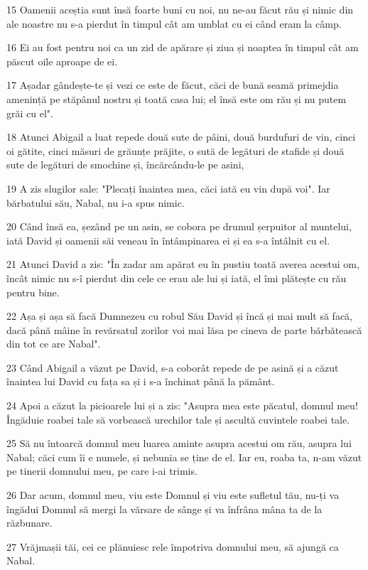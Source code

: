 \par 15 Oamenii aceștia sunt însă foarte buni cu noi, nu ne-au făcut rău și nimic din ale noastre nu s-a pierdut în timpul cât am umblat cu ei când eram la câmp.
\par 16 Ei au fost pentru noi ca un zid de apărare și ziua și noaptea în timpul cât am păscut oile aproape de ei.
\par 17 Așadar gândește-te și vezi ce este de făcut, căci de bună seamă primejdia amenință pe stăpânul nostru și toată casa lui; el însă este om rău și nu putem grăi cu el".
\par 18 Atunci Abigail a luat repede două sute de pâini, două burdufuri de vin, cinci oi gătite, cinci măsuri de grăunțe prăjite, o sută de legături de stafide și două sute de legături de smochine și, încărcându-le pe asini,
\par 19 A zis slugilor sale: "Plecați înaintea mea, căci iată eu vin după voi". Iar bărbatului său, Nabal, nu i-a spus nimic.
\par 20 Când însă ea, șezând pe un asin, se cobora pe drumul șerpuitor al muntelui, iată David și oamenii săi veneau în întâmpinarea ei și ea s-a întâlnit cu el.
\par 21 Atunci David a zis: "În zadar am apărat eu în pustiu toată averea acestui om, încât nimic nu s-î pierdut din cele ce erau ale lui și iată, el îmi plătește cu rău pentru bine.
\par 22 Așa și așa să facă Dumnezeu cu robul Său David și încă și mai mult să facă, dacă până mâine în revărsatul zorilor voi mai lăsa pe cineva de parte bărbătească din tot ce are Nabal".
\par 23 Când Abigail a văzut pe David, s-a coborât repede de pe asină și a căzut înaintea lui David cu fața sa și i s-a închinat până la pământ.
\par 24 Apoi a căzut la picioarele lui și a zis: "Asupra mea este păcatul, domnul meu! Îngăduie roabei tale să vorbească urechilor tale și ascultă cuvintele roabei tale.
\par 25 Să nu întoarcă domnul meu luarea aminte asupra acestui om rău, asupra lui Nabal; căci cum îi e numele, și nebunia se ține de el. Iar eu, roaba ta, n-am văzut pe tinerii domnului meu, pe care i-ai trimis.
\par 26 Dar acum, domnul meu, viu este Domnul și viu este sufletul tău, nu-ți va îngădui Domnul să mergi la vărsare de sânge și va înfrâna mâna ta de la răzbunare.
\par 27 Vrăjmașii tăi, cei ce plănuiesc rele împotriva domnului meu, să ajungă ca Nabal.

